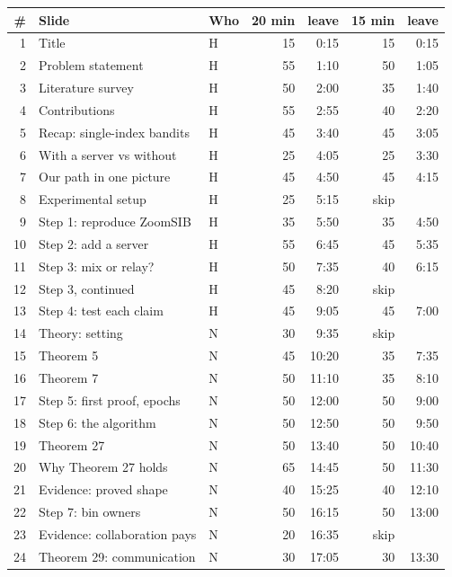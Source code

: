 \documentclass[12pt,a4paper]{article}
\begin{document}
\vspace{0.3em}
{\footnotesize\linespread{1}\selectfont
\renewcommand{\arraystretch}{1.0}
\begin{tabular}{@{}r>{\raggedright\arraybackslash}p{7.6cm}lrrrr@{}}
\toprule
\# & Slide & Who & 20 min & leave & 15 min & leave\\
\midrule
1 & Title & H & 15 & 0:15 & 15 & 0:15\\
2 & Problem statement & H & 55 & 1:10 & 50 & 1:05\\
3 & Literature survey & H & 50 & 2:00 & 35 & 1:40\\
4 & Contributions & H & 55 & 2:55 & 40 & 2:20\\
5 & Recap: single-index bandits & H & 45 & 3:40 & 45 & 3:05\\
6 & With a server vs without & H & 25 & 4:05 & 25 & 3:30\\
7 & Our path in one picture & H & 45 & 4:50 & 45 & 4:15\\
8 & Experimental setup & H & 25 & 5:15 & skip & \\
9 & Step 1: reproduce ZoomSIB & H & 35 & 5:50 & 35 & 4:50\\
10 & Step 2: add a server & H & 55 & 6:45 & 45 & 5:35\\
11 & Step 3: mix or relay? & H & 50 & 7:35 & 40 & 6:15\\
12 & Step 3, continued & H & 45 & 8:20 & skip & \\
13 & Step 4: test each claim & H & 45 & 9:05 & 45 & 7:00\\
14 & Theory: setting & N & 30 & 9:35 & skip & \\
15 & Theorem 5 & N & 45 & 10:20 & 35 & 7:35\\
16 & Theorem 7 & N & 50 & 11:10 & 35 & 8:10\\
17 & Step 5: first proof, epochs & N & 50 & 12:00 & 50 & 9:00\\
18 & Step 6: the algorithm & N & 50 & 12:50 & 50 & 9:50\\
19 & Theorem 27 & N & 50 & 13:40 & 50 & 10:40\\
20 & Why Theorem 27 holds & N & 65 & 14:45 & 50 & 11:30\\
21 & Evidence: proved shape & N & 40 & 15:25 & 40 & 12:10\\
22 & Step 7: bin owners & N & 50 & 16:15 & 50 & 13:00\\
23 & Evidence: collaboration pays & N & 20 & 16:35 & skip & \\
24 & Theorem 29: communication & N & 30 & 17:05 & 30 & 13:30\\

\end{tabular}}
\end{document}
